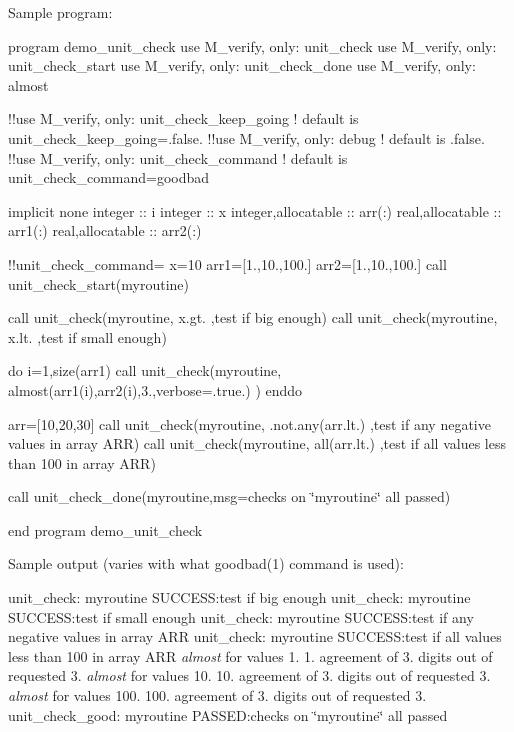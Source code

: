 Sample program\+:

program demo\+\_\+unit\+\_\+check use M\+\_\+verify, only\+: unit\+\_\+check use M\+\_\+verify, only\+: unit\+\_\+check\+\_\+start use M\+\_\+verify, only\+: unit\+\_\+check\+\_\+done use M\+\_\+verify, only\+: almost

!!use M\+\_\+verify, only\+: unit\+\_\+check\+\_\+keep\+\_\+going ! default is unit\+\_\+check\+\_\+keep\+\_\+going=.false. !!use M\+\_\+verify, only\+: debug ! default is .false. !!use M\+\_\+verify, only\+: unit\+\_\+check\+\_\+command ! default is unit\+\_\+check\+\_\+command=\textquotesingle{}goodbad\textquotesingle{}

implicit none integer \+:\+: i integer \+:\+: x integer,allocatable \+:\+: arr(\+:) real,allocatable \+:\+: arr1(\+:) real,allocatable \+:\+: arr2(\+:)

!!unit\+\_\+check\+\_\+command=\textquotesingle{}\textquotesingle{} x=10 arr1=\mbox{[}1.,10.,100.\mbox{]} arr2=\mbox{[}1.,10.,100.\mbox{]} call unit\+\_\+check\+\_\+start(\textquotesingle{}myroutine\textquotesingle{})

call unit\+\_\+check(\textquotesingle{}myroutine\textquotesingle{}, x.\+gt. ,\textquotesingle{}test if big enough\textquotesingle{}) call unit\+\_\+check(\textquotesingle{}myroutine\textquotesingle{}, x.\+lt. ,\textquotesingle{}test if small enough\textquotesingle{})

do i=1,size(arr1) call unit\+\_\+check(\textquotesingle{}myroutine\textquotesingle{}, almost(arr1(i),arr2(i),3.,verbose=.true.) ) enddo

arr=\mbox{[}10,20,30\mbox{]} call unit\+\_\+check(\textquotesingle{}myroutine\textquotesingle{}, .not.\+any(arr.\+lt.) ,\textquotesingle{}test if any negative values in array A\+RR\textquotesingle{}) call unit\+\_\+check(\textquotesingle{}myroutine\textquotesingle{}, all(arr.\+lt.) ,\textquotesingle{}test if all values less than 100 in array A\+RR\textquotesingle{})

call unit\+\_\+check\+\_\+done(\textquotesingle{}myroutine\textquotesingle{},msg=\textquotesingle{}checks on \char`\"{}myroutine\char`\"{} all passed\textquotesingle{})

end program demo\+\_\+unit\+\_\+check

Sample output (varies with what goodbad(1) command is used)\+:

unit\+\_\+check\+: myroutine S\+U\+C\+C\+E\+SS\+:test if big enough unit\+\_\+check\+: myroutine S\+U\+C\+C\+E\+SS\+:test if small enough unit\+\_\+check\+: myroutine S\+U\+C\+C\+E\+SS\+:test if any negative values in array A\+RR unit\+\_\+check\+: myroutine S\+U\+C\+C\+E\+SS\+:test if all values less than 100 in array A\+RR {\itshape almost} for values 1. 1. agreement of 3. digits out of requested 3. {\itshape almost} for values 10. 10. agreement of 3. digits out of requested 3. {\itshape almost} for values 100. 100. agreement of 3. digits out of requested 3. unit\+\_\+check\+\_\+good\+: myroutine P\+A\+S\+S\+ED\+:checks on \char`\"{}myroutine\char`\"{} all passed

